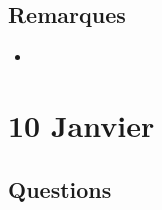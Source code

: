 \documentclass[a4paper, 11pt, hidelinks]{article}
\begin{document}
\subsection{Remarques}



\begin{itemize}
    \item 
\end{itemize}






\section{10 Janvier}


\subsection{Questions}
\end{document}
